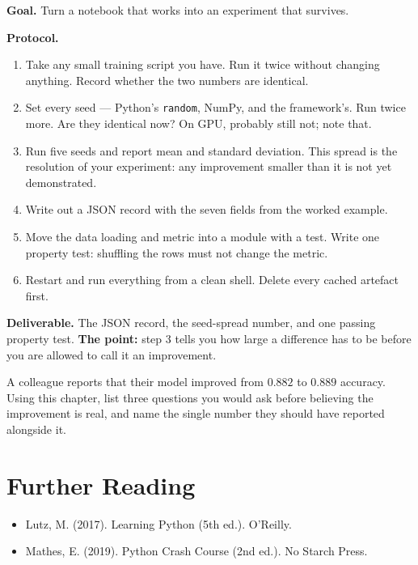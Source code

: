 \begin{practicallab}
\textbf{Goal.} Turn a notebook that works into an experiment that survives.

\textbf{Protocol.}
\begin{enumerate}
  \item Take any small training script you have. Run it twice without changing
        anything. Record whether the two numbers are identical.
  \item Set every seed --- Python's \texttt{random}, NumPy, and the
        framework's. Run twice more. Are they identical now? On GPU, probably
        still not; note that.
  \item Run five seeds and report mean and standard deviation. This spread is
        the resolution of your experiment: any improvement smaller than it is
        not yet demonstrated.
  \item Write out a JSON record with the seven fields from the worked example.
  \item Move the data loading and metric into a module with a test. Write one
        property test: shuffling the rows must not change the metric.
  \item Restart and run everything from a clean shell. Delete every cached
        artefact first.
\end{enumerate}

\textbf{Deliverable.} The JSON record, the seed-spread number, and one passing
property test. \textbf{The point:} step 3 tells you how large a difference has
to be before you are allowed to call it an improvement.
\end{practicallab}

\begin{checkpoint}
A colleague reports that their model improved from $0.882$ to $0.889$ accuracy.
Using this chapter, list three questions you would ask before believing the
improvement is real, and name the single number they should have reported
alongside it.
\end{checkpoint}


\section{Further Reading}
\begin{itemize}
    \item Lutz, M. (2017). Learning Python (5th ed.). O'Reilly.
    \item Mathes, E. (2019). Python Crash Course (2nd ed.). No Starch Press.
\end{itemize}

